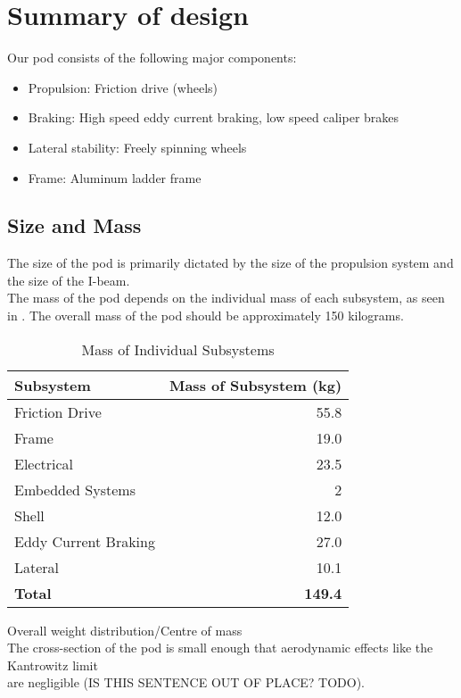 \documentclass[main.tex]{subfiles}
\begin{document}
\section{Summary of design}
Our pod consists of the following major components:
\begin{itemize}
    \item Propulsion: Friction drive (wheels)
    \item Braking: High speed eddy current braking, low speed caliper brakes
    \item Lateral stability: Freely spinning wheels
    \item Frame: Aluminum ladder frame
\end{itemize}

\subsection{Size and Mass}
The size of the pod is primarily dictated by the size of the propulsion system and the size of the I-beam.\\
  The mass of the pod depends on the individual mass of each subsystem, as seen in . The overall mass of the pod should be approximately 150 kilograms.

\begin{table}[H]
\centering
\begin{tabular}{@{}lr@{}} 
	\toprule Subsystem & Mass of Subsystem (\si{kg}) \\ \midrule
    Friction Drive & 55.8 \\
    Frame & 19.0 \\
    Electrical & 23.5 \\
    Embedded Systems & 2 \\
    Shell & 12.0 \\
    Eddy Current Braking & 27.0 \\
    Lateral & 10.1 \\ \midrule
    \textbf{Total} & \textbf{149.4}
\end{tabular}
  \caption{Mass of Individual Subsystems}
  \label{table:mass}
\end{table}

Overall weight distribution/Centre of mass\\
The cross-section of the pod is small enough that aerodynamic effects like the Kantrowitz limit\\
are negligible (IS THIS SENTENCE OUT OF PLACE? TODO).\\
\end{document}
